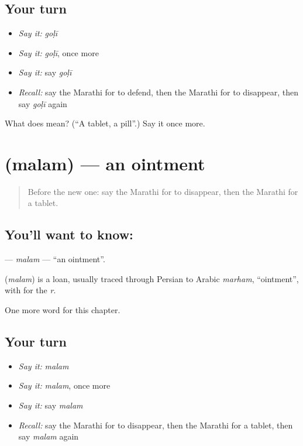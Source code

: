 \subsection*{Your turn}
\begin{itemize}
\raggedright
  \item \emph{Say it:} \emph{goḷī}
  \item \emph{Say it:} \emph{goḷī}, once more
  \item \emph{Say it:} say \emph{goḷī}
  \item \emph{Recall:} say the Marathi for to defend, then the Marathi for to disappear, then say \emph{goḷī} again
\end{itemize}

\begin{tcolorbox}[breakable,colback=teal!4,colframe=teal!35!black,title={Before you move on}]
What does  mean? (\textquotedblleft{}A tablet, a pill\textquotedblright{}.) Say it once more.
\end{tcolorbox}
\section[\texorpdfstring{\mr{मलम} (malam)}{मलम (malam)}]{ (malam) — an ointment}

\label{lesson:MR-C229-malam}



\begin{quote}
Before the new one: say the Marathi for to disappear, then the Marathi for a tablet.
\end{quote}

\subsection*{You'll want to know: }
\textbf{} — \emph{malam} — \textquotedblleft{}an ointment\textquotedblright{}.

\begin{cousinweb}
\textbf{} (\emph{malam}) is a loan, usually traced through Persian to Arabic \emph{marham}, \textquotedblleft{}ointment\textquotedblright{}, with \textbf{} for the \emph{r}.
\end{cousinweb}

\begin{grammarlens}[title={What you've built}]
One more word for this chapter.
\end{grammarlens}

\subsection*{Your turn}
\begin{itemize}
\raggedright
  \item \emph{Say it:} \emph{malam}
  \item \emph{Say it:} \emph{malam}, once more
  \item \emph{Say it:} say \emph{malam}
  \item \emph{Recall:} say the Marathi for to disappear, then the Marathi for a tablet, then say \emph{malam} again
\end{itemize}

